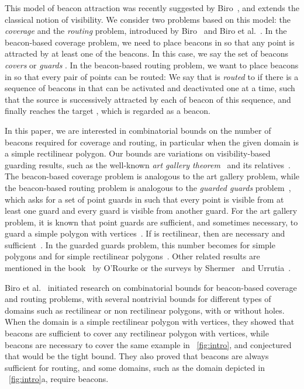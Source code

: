 \documentclass[11pt]{article}
\theoremstyle{definition}
\begin{document}
This model of beacon attraction was recently suggested by 
Biro~\cite{b-bbrg-13, bgikm-cccg-13, bikm-wads-13},
and extends the classical notion of visibility.
We consider two problems based on this model:
the \emph{coverage} and the \emph{routing} problem,
introduced by Biro~\cite{b-bbrg-13} and Biro et al.~\cite{bgikm-cccg-13,bikm-wads-13}.
In the beacon-based coverage problem, we need to place beacons in 
so that any point  is attracted by at least one of the beacons.
In this case, we say the set of beacons \emph{covers} or \emph{guards} .
In the beacon-based routing problem, we want to place beacons in 
so that every pair  of points can be routed:
We say that  is  \emph{routed} to  if there is a sequence of beacons in 
that can be activated and deactivated one at a time,
such that the source  is successively attracted by each of beacon of this sequence,
and finally reaches the target , which is regarded as a beacon.

In this paper, we are interested in combinatorial bounds
on the number of beacons required for coverage and routing,
in particular when the given domain  is a simple rectilinear polygon.
Our bounds are variations on visibility-based guarding results, such
as the well-known \emph{art gallery theorem}~\cite{c-ctpg-75} and
its relatives~\cite{o-apragt-83,ghks-ggprp-96, kkk-tgrfw-83, g-spragt-86, mp-agtgg-03}.
The beacon-based coverage problem is analogous to the art gallery problem,
while the beacon-based routing problem is analogous to the \emph{guarded guards} 
problem~\cite{mp-agtgg-03}, 
which asks for a set of point guards in  such that every point is visible from
at least one guard and every guard is visible from another guard.
For the art gallery problem, it is known that
 point guards are sufficient, and sometimes necessary,
to guard a simple polygon  with  vertices~\cite{c-ctpg-75}.
If  is rectilinear, then  are necessary and 
sufficient~\cite{kkk-tgrfw-83,o-agta-87, g-spragt-86}.
In the guarded guards problem, this number
becomes  for simple polygons
and  for simple rectilinear polygons~\cite{mp-agtgg-03}.
Other related results are mentioned in the book~\cite{o-agta-87} by O'Rourke
or the surveys by Shermer~\cite{s-rrag-92} and Urrutia~\cite{u-agip-00}.

Biro et al.~\cite{bgikm-cccg-13} initiated research on combinatorial bounds
for beacon-based coverage and routing problems,
with several nontrivial bounds for different types of domains such as
rectilinear or non rectilinear polygons, with or without holes.
When the domain  is a simple rectilinear polygon with  vertices, they showed that  beacons are sufficient to cover
any rectilinear polygon with  vertices,
while  beacons are necessary to cover
the same example in \figurename~\ref{fig:intro},
and conjectured that  would be the tight bound.
They also proved that  beacons are always sufficient for routing, and some domains, such as the domain depicted in \figurename~\ref{fig:intro}a, require  beacons.
\end{document}
